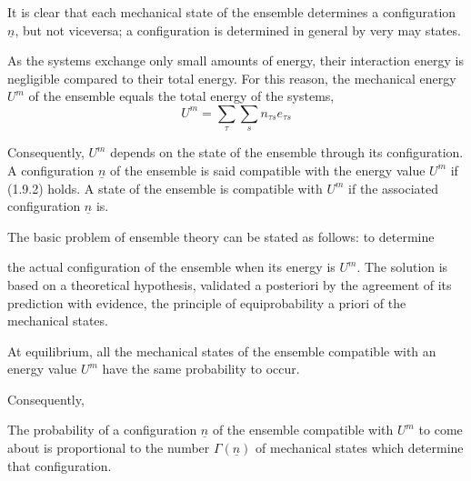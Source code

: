 \documentclass{article}
\begin{document}
It is clear that each mechanical state of the ensemble determines a configuration $\underline{n}$, but not viceversa; a configuration is determined in general by very may states.

As the systems exchange only small amounts of energy, their interaction energy is negligible compared to their total energy. For this reason, the mechanical energy $U^{m}$ of the ensemble equals the total energy of the systems,
$$
\begin{equation*}
U^{m}=\sum_{\tau} \sum_{s} n_{\tau s} e_{\tau s} \tag{1.9.2}
\end{equation*}
$$

Consequently, $U^{m}$ depends on the state of the ensemble through its configuration. A configuration $\underline{n}$ of the ensemble is said compatible with the energy value $U^{m}$ if (1.9.2) holds. A state of the ensemble is compatible with $U^{m}$ if the associated configuration $\underline{n}$ is.

The basic problem of ensemble theory can be stated as follows: to determine

the actual configuration of the ensemble when its energy is $U^{m}$. The solution is based on a theoretical hypothesis, validated a posteriori by the agreement of its prediction with evidence, the principle of equiprobability a priori of the mechanical states.

At equilibrium, all the mechanical states of the ensemble compatible with an energy value $U^{m}$ have the same probability to occur.

Consequently,

The probability of a configuration $\underline{n}$ of the ensemble compatible with $U^{m}$ to come about is proportional to the number $\Gamma(\underline{n})$ of mechanical states which determine that configuration.
\end{document}
